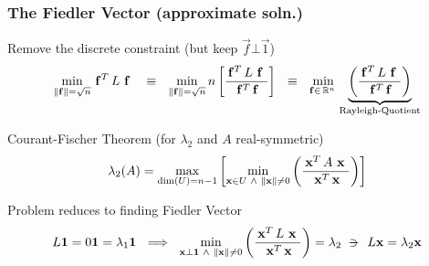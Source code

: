 \begin{frame}
  \frametitle{The Fiedler Vector (approximate soln.)}
  \begin{block}{Remove the discrete constraint (but keep $\vec{f} \bot \vec{1}$)}
    \[
\setlength\abovedisplayskip{0pt}    
\min\limits_{\norm{\vec{f}} = \sqrt{n}} \trans{\vec{f}} L \ds{\vec{f}}
\ds{\ds{\equiv}}
  \min\limits_{\norm{\vec{f}} = \sqrt{n}}
  n \left[
  \dfrac{\trans{\vec{f}} L \ds{\vec{f}}}{\trans{\vec{f}} \vec{f}}
  \right]
\ds{\ds{\equiv}}
\min\limits_{\vec{f} \in \R{n}}
  \underbrace{
    \left(\dfrac{\trans{\vec{f}} L \ds{\vec{f}}}{\trans{\vec{f}} \vec{f}}\right)
  }_{\text{Rayleigh-Quotient}}    
\setlength\belowdisplayskip{0pt}  
\]    
  \end{block}
  \begin{block}{Courant-Fischer Theorem (for $\lambda_2$ and $A$ real-symmetric)}
\setlength\abovedisplayskip{0pt}
\[
\setlength\abovedisplayskip{0pt}
\lambda_2(A) =
\max\limits_{\func{dim}(U) = n-1}
\left[
\min\limits_{\vec{x} \in U \ds{\land} \norm{\vec{x}} \ne 0}
\left(  
\dfrac{\trans{\vec{x}} A \ds{\vec{x}}}{\trans{\vec{x}} \vec{x}}
\right)
\right]
\]    
  \end{block}

  \begin{block}{Problem reduces to finding Fiedler Vector}
\setlength\abovedisplayskip{0pt}
\[
L\vec{1} = 0 \vec{1} = \lambda_1 \vec{1}
\ds{\implies}
\min\limits_{\vec{x} \bot \vec{1} \ds{\land} \norm{\vec{x}} \ne 0}
\left(  
\dfrac{\trans{\vec{x}} L \ds{\vec{x}}}{\trans{\vec{x}} \vec{x}}
\right)
= \lambda_2
\suchthat{L\vec{x} = \lambda_2\vec{x}}
\]    
  \end{block}
\end{frame}
